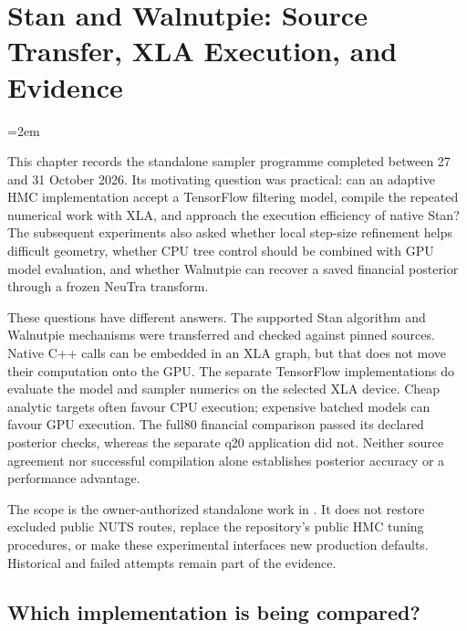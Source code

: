 \chapter[Stan and Walnutpie]{Stan and Walnutpie: Source Transfer, XLA Execution, and Evidence}
\label{ch:stan-walnutpie}
\begingroup
\emergencystretch=2em
\expandafter\def\expandafter\UrlBreaks\expandafter{\UrlBreaks
\do\a\do\b\do\c\do\d\do\e\do\f\do\g\do\h\do\i\do\j
\do\k\do\l\do\m\do\n\do\o\do\p\do\q\do\r\do\s\do\t
\do\u\do\v\do\w\do\x\do\y\do\z\do\-\do\_}

This chapter records the standalone sampler programme completed between
27 and 31 October 2026. Its motivating question was practical: can an
adaptive HMC implementation accept a TensorFlow filtering model, compile
the repeated numerical work with XLA, and approach the execution efficiency
of native Stan? The subsequent experiments also asked whether local
step-size refinement helps difficult geometry, whether CPU tree control
should be combined with GPU model evaluation, and whether Walnutpie can
recover a saved financial posterior through a frozen NeuTra transform.

These questions have different answers. The supported Stan algorithm and
Walnutpie mechanisms were transferred and checked against pinned sources.
Native C++ calls can be embedded in an XLA graph, but that does not move
their computation onto the GPU. The separate TensorFlow implementations do
evaluate the model and sampler numerics on the selected XLA device. Cheap
analytic targets often favour CPU execution; expensive batched models can
favour GPU execution. The full80 financial comparison passed its declared
posterior checks, whereas the separate q20 application did not. Neither
source agreement nor successful compilation alone establishes posterior
accuracy or a performance advantage.

The scope is the owner-authorized standalone work in
. It does not restore excluded public NUTS routes,
replace the repository's public HMC tuning procedures, or make these
experimental interfaces new production defaults. Historical and failed
attempts remain part of the evidence.

\section{Which implementation is being compared?}
\label{sec:sw-implementations}

